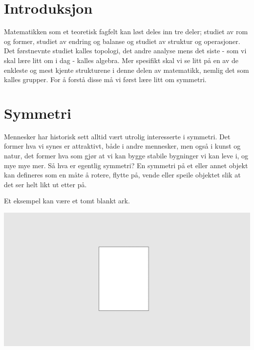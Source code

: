 

\section{Introduksjon}

Matematikken som et teoretisk fagfelt kan løst deles inn tre deler; 
studiet av rom og former, 
studiet av endring og balanse og studiet av struktur og operasjoner. 
Det førstnevnte studiet kalles topologi, 
det andre analyse mens det siste - som vi skal lære litt om i dag - kalles algebra. 
Mer spesifikt skal vi se litt på en av de enkleste og mest kjente strukturene i denne delen av matematikk, 
nemlig det som kalles grupper. 
For å forstå disse må vi først lære litt om symmetri.  

\section{Symmetri}

Mennesker har historisk sett alltid vært utrolig interesserte i symmetri. 
Det former hva vi synes er attraktivt, 
både i andre mennesker, 
men også i kunst og natur, 
det former hva som gjør at vi kan bygge stabile bygninger vi kan leve i, 
og mye mye mer. 
Så hva er egentlig symmetri? 
En symmetri på et eller annet objekt kan defineres som en måte å rotere, 
flytte på, 
vende eller speile objektet slik at det ser helt likt ut etter på. 

Et eksempel kan være et tomt blankt ark. 
\begin{center}
\includegraphics[width=\textwidth]{img/identity.jpg}
\end{center}

